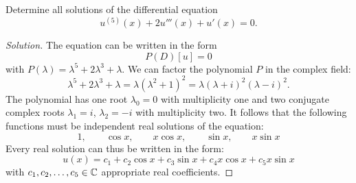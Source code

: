 \begin{example}
Determine all solutions of the differential equation
\[
  u^{(5)}(x) + 2 u'''(x) + u'(x) = 0.
\]
\end{example}
%
\begin{proof}[Solution]
The equation can be written in the form
\[
  P(D) [u] = 0
\]
with $P(\lambda) = \lambda^5 + 2 \lambda^3+\lambda$. 
We can factor the polynomial $P$ in the complex field:
\[
\lambda^5 + 2\lambda^3 +\lambda = \lambda(\lambda^2+1)^2 = \lambda (\lambda+i)^2(\lambda-i)^2.
\]
The polynomial has one root $\lambda_0=0$ with multiplicity one and two
conjugate complex roots
$\lambda_1 = i$, $\lambda_2=-i$ with multiplicity two.
It follows that the following functions must be independent real solutions of
the equation:
\begin{equation}\label{eq:4995566}
 1, \qquad
 \cos x, \qquad
 x \cos x, \qquad
 \sin x, \qquad
 x \sin x
\end{equation}
Every real solution can thus be written in the form:
\begin{equation}\label{eq:499355456}
  u(x) = c_1 + c_2 \cos x + c_3 \sin x + c_4 x \cos x + c_5 x \sin x
\end{equation}
with $c_1, c_2, \dots, c_5 \in {\mathbb C}$ appropriate real coefficients.
\end{proof}

